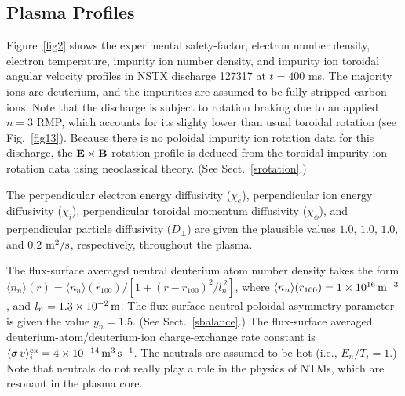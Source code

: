 \documentclass[12pt,prb,aps]{revtex4-1}
\begin{document}
\subsection{Plasma Profiles}
Figure~\ref{fig2} shows the experimental safety-factor, electron number density, electron temperature, impurity ion number density, and impurity ion toroidal angular velocity profiles in NSTX discharge 127317 at $t=400$ ms. The majority ions are deuterium, and the impurities are assumed to
be fully-stripped carbon ions. Note that the discharge is subject to rotation braking due to an applied $n=3$ RMP, which accounts for its slighty lower than usual toroidal rotation (see Fig.~\ref{fig13}). Because there is no
poloidal impurity ion rotation data for this discharge, the ${\bf E}\times {\bf B}$ rotation profile is deduced from the
toroidal  impurity ion rotation data using neoclassical theory. (See Sect.~\ref{srotation}.) 

The perpendicular electron energy diffusivity ($\chi_e$), perpendicular ion energy diffusivity ($\chi_i$), perpendicular toroidal momentum diffusivity ($\chi_\phi$), and perpendicular particle diffusivity ($D_\perp$) are given the plausible values $1.0$, $1.0$, $1.0$, and $0.2$
${\rm m}^2/{\rm s}$, respectively,  throughout the plasma.

 The flux-surface averaged neutral deuterium atom number density takes the form $\langle n_n\rangle(r) = \langle n_n\rangle(r_{100})/[1+(r-r_{100})^2/l_n^{\,2}]$, where
$\langle n_n\rangle(r_{100})= 1\times 10^{16}\,{\rm m}^{-3}$, and $l_n=1.3\times 10^{-2}\,{\rm m}$. The flux-surface neutral poloidal asymmetry parameter is given the value $y_n=1.5$. (See Sect.~\ref{sbalance}.) The flux-surface averaged deuterium-atom/deuterium-ion charge-exchange rate constant is $\langle \sigma\,v\rangle_i^{{\rm cx}} = 4\times 10^{-14}\,{\rm m}^{3}\,{\rm s}^{-1}$.\cite{barnett} The neutrals are assumed to be hot (i.e., $E_n/T_i=1$.) 
Note that neutrals do not really play a role in the physics of NTMs, which are resonant in the plasma core. 
\end{document}
